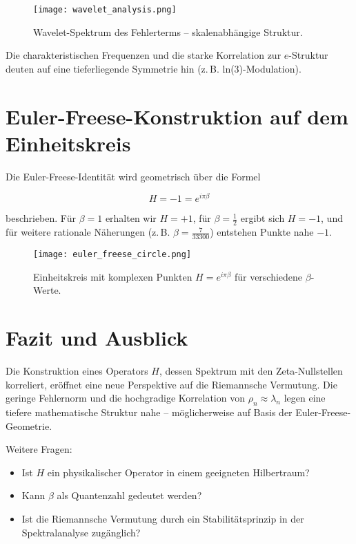 \documentclass[12pt]{article}
\begin{document}
\begin{figure}[H]
\centering
\texttt{[image: wavelet\_analysis.png]}
\caption{Wavelet-Spektrum des Fehlerterms – skalenabhängige Struktur.}
\end{figure}

Die charakteristischen Frequenzen und die starke Korrelation zur $e$-Struktur deuten auf eine tieferliegende Symmetrie hin (z.\,B. ln(3)-Modulation).

\section{Euler-Freese-Konstruktion auf dem Einheitskreis}
Die Euler-Freese-Identität wird geometrisch über die Formel

\[
H = -1 = e^{i \pi \beta}
\]

beschrieben. Für $\beta = 1$ erhalten wir $H = +1$, für $\beta = \frac{1}{2}$ ergibt sich $H = -1$, und für weitere rationale Näherungen (z.\,B. $\beta = \frac{7}{33300}$) entstehen Punkte nahe $-1$.

\begin{figure}[H]
\centering
\texttt{[image: euler\_freese\_circle.png]}
\caption{Einheitskreis mit komplexen Punkten $H = e^{i \pi \beta}$ für verschiedene $\beta$-Werte.}
\end{figure}

\section{Fazit und Ausblick}
Die Konstruktion eines Operators $H$, dessen Spektrum mit den Zeta-Nullstellen korreliert, eröffnet eine neue Perspektive auf die Riemannsche Vermutung. Die geringe Fehlernorm und die hochgradige Korrelation von $\rho_n \approx \lambda_n$ legen eine tiefere mathematische Struktur nahe – möglicherweise auf Basis der Euler-Freese-Geometrie. 

\vspace{0.5cm}
\noindent Weitere Fragen:
\begin{itemize}
    \item Ist $H$ ein physikalischer Operator in einem geeigneten Hilbertraum?
    \item Kann $\beta$ als Quantenzahl gedeutet werden?
    \item Ist die Riemannsche Vermutung durch ein Stabilitätsprinzip in der Spektralanalyse zugänglich?
\end{itemize}
\end{document}
